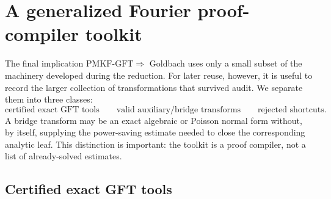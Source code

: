 \documentclass[11pt]{article}
\theoremstyle{definition}
\theoremstyle{remark}
\newcommand{\1}{\mathbf 1}
\newcommand{\PMKF}{\mathrm{PMKF}\text{-}\mathrm{GFT}}
\begin{document}
\section{A generalized Fourier proof-compiler toolkit}\label{sec:toolkit}

The final implication \(\PMKF\Rightarrow\) Goldbach uses only a small subset of the
machinery developed during the reduction.  For later reuse, however, it is useful
to record the larger collection of transformations that survived audit.  We
separate them into three classes:
\[
 \boxed{\text{certified exact GFT tools}}
 \qquad
 \boxed{\text{valid auxiliary/bridge transforms}}
 \qquad
 \boxed{\text{rejected shortcuts}}.
\]
A bridge transform may be an exact algebraic or Poisson normal form without, by
itself, supplying the power-saving estimate needed to close the corresponding
analytic leaf.  This distinction is important: the toolkit is a proof compiler,
not a list of already-solved estimates.

\subsection{Certified exact GFT tools}
\end{document}
